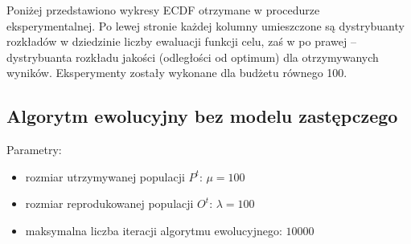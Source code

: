 \documentclass[runningheads]{llncs}
\begin{document}
Poniżej przedstawiono wykresy ECDF otrzymane w procedurze eksperymentalnej. Po 
lewej stronie każdej kolumny umieszczone są dystrybuanty rozkładów w dziedzinie 
liczby ewaluacji funkcji celu, zaś w po prawej -- dystrybuanta rozkładu jakości 
(odległości od optimum) dla otrzymywanych wyników. Eksperymenty zostały 
wykonane dla budżetu równego 100.
\newpage  
\subsection{Algorytm ewolucyjny bez modelu zastępczego}
Parametry:
\begin{itemize}
 \item rozmiar utrzymywanej populacji $P^t$: $\mu=100$
 \item rozmiar reprodukowanej populacji $O^t$: $\lambda=100$
 \item maksymalna liczba iteracji algorytmu ewolucyjnego: $10000$
\end{itemize}
\end{document}
